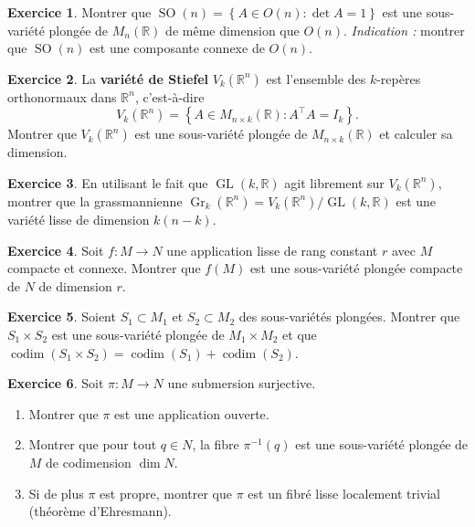 \documentclass[12pt,a4paper,openany]{book}
\theoremstyle{definition}
\newtheorem{exercice}{Exercice}[chapter]
\theoremstyle{plain}
\theoremstyle{remark}
\newcommand{\R}{\mathbb{R}}
\DeclareMathOperator{\GL}{GL}
\DeclareMathOperator{\SO}{SO}
\newcommand{\set}[1]{\left\{#1\right\}}
\begin{document}
\begin{exercice}\label{exo:SOn-variete}
\index{SO(n)@$\SO(n)$!comme sous-variété}
Montrer que $\SO(n) = \set{A \in O(n) : \det A = 1}$ est une sous-variété
plongée de $M_n(\R)$ de même dimension que $O(n)$.
\textit{Indication :} montrer que $\SO(n)$ est une composante connexe de $O(n)$.
\end{exercice}

\begin{exercice}\label{exo:stiefel}
La \textbf{variété de Stiefel} $V_k(\R^n)$ est l'ensemble des $k$-repères
orthonormaux dans $\R^n$, c'est-à-dire
\[
  V_k(\R^n) = \set{A \in M_{n \times k}(\R) : A^\top A = I_k}.
\]
Montrer que $V_k(\R^n)$ est une sous-variété plongée de $M_{n \times k}(\R)$
et calculer sa dimension.
\end{exercice}

\begin{exercice}\label{exo:grassmannienne-dim}
En utilisant le fait que $\GL(k, \R)$ agit librement sur $V_k(\R^n)$,
montrer que la grassmannienne $\operatorname{Gr}_k(\R^n) = V_k(\R^n)/\GL(k, \R)$
est une variété lisse de dimension $k(n - k)$.
\end{exercice}

\begin{exercice}\label{exo:rang-constant-surjectif}
Soit $f : M \to N$ une application lisse de rang constant $r$ avec $M$ compacte et connexe.
Montrer que $f(M)$ est une sous-variété plongée compacte de $N$ de dimension $r$.
\end{exercice}

\begin{exercice}\label{exo:produit-sous-variete}
Soient $S_1 \subset M_1$ et $S_2 \subset M_2$ des sous-variétés plongées.
Montrer que $S_1 \times S_2$ est une sous-variété plongée de $M_1 \times M_2$
et que $\operatorname{codim}(S_1 \times S_2) = \operatorname{codim}(S_1) + \operatorname{codim}(S_2)$.
\end{exercice}

\begin{exercice}\label{exo:submersion-sections}
Soit $\pi : M \to N$ une submersion surjective.
\begin{enumerate}[label=(\alph*)]
  \item Montrer que $\pi$ est une application ouverte.
  \item Montrer que pour tout $q \in N$, la fibre $\pi^{-1}(q)$ est une
    sous-variété plongée de $M$ de codimension $\dim N$.
  \item Si de plus $\pi$ est propre, montrer que $\pi$ est un fibré lisse
    localement trivial (théorème d'Ehresmann).
\end{enumerate}
\end{exercice}
\end{document}
